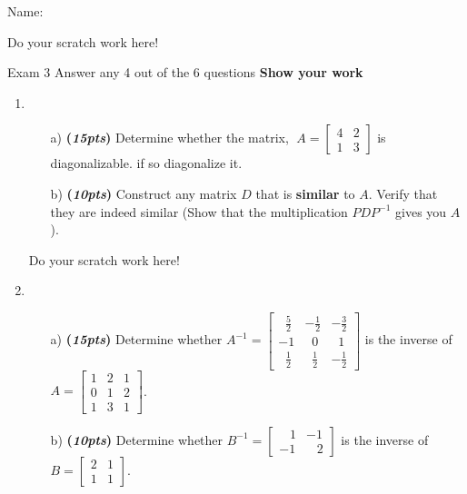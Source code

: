 \documentclass[12pt]{article}%
\begin{document}
Name:\hrulefill

\newpage
 Do your scratch work here!
 
\newpage
     

Exam 3 \hfill Answer any 4 out of the 6 questions \hfill \textbf{Show your work}
\\
\HRule


\begin{enumerate} 
    \item 
    \begin{itemize}
        \item[a)]\textbf{(\emph{15pts})} Determine whether the matrix, 
        \(\;A = \begin{bmatrix} 4 & 2 \\ 1 & 3 \end{bmatrix}\) is diagonalizable. if so diagonalize it.
    
    \vspace{10cm}
    
    \item[b)]\textbf{(\emph{10pts})} Construct any matrix \(D\) that is \textbf{similar} to \(A\).
    Verify that they are indeed similar (Show that the multiplication \(PDP^{-1}\) gives you \(A\)).
    \end{itemize}

    \newpage
     Do your scratch work here!
     
    \newpage
    
    \item 
    \begin{itemize}
        \item[a)]\textbf{(\emph{15pts})} Determine whether \(A^{-1} = \begin{bmatrix} \;\;\frac{5}{2} & -\frac{1}{2} & -\frac{3}{2} \\ -1 & \;\;0 & \;\;1 \\ \;\;\frac{1}{2} & \;\;\frac{1}{2} & -\frac{1}{2} \end{bmatrix}\) is the inverse of  \(A = \begin{bmatrix} 1 & 2 & 1 \\ 0 & 1 & 2 \\ 1 & 3 & 1 \end{bmatrix}\).

        \vspace{12.5cm}

        \item[b)]\textbf{(\emph{10pts})} Determine whether \(B^{-1} = \begin{bmatrix} \;\;\;1 & -1 \\ -1 & \;\;\;2 \end{bmatrix}\) is the inverse of  \(B = \begin{bmatrix} 2 & 1 \\ 1 & 1 \end{bmatrix}\).
    \end{itemize}


\end{enumerate}
\end{document}
